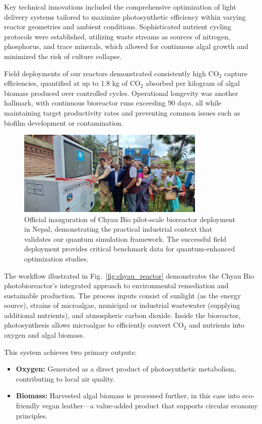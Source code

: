 \documentclass{article}
\begin{document}
Key technical innovations included the comprehensive optimization of light delivery systems tailored to maximize photosynthetic efficiency within varying reactor geometries and ambient conditions. Sophisticated nutrient cycling protocols were established, utilizing waste streams as sources of nitrogen, phosphorus, and trace minerals, which allowed for continuous algal growth and minimized the risk of culture collapse.

Field deployments of our reactors demonstrated consistently high CO$_2$ capture efficiencies, quantified at up to 1.8 kg of CO$_2$ absorbed per kilogram of algal biomass produced over controlled cycles. Operational longevity was another hallmark, with continuous bioreactor runs exceeding 90 days, all while maintaining target productivity rates and preventing common issues such as biofilm development or contamination.

\begin{figure}[h]
    \centering
    \includegraphics[width=0.8\textwidth]{inauguration-mayor.jpg}
    \caption{Official inauguration of Chyau Bio pilot-scale bioreactor deployment in Nepal, demonstrating the practical industrial context that validates our quantum simulation framework. The successful field deployment provides critical benchmark data for quantum-enhanced optimization studies.}
    \label{fig:chyau_deployment}
\end{figure}

The workflow illustrated in Fig.~\ref{fig:chyau_reactor} demonstrates the Chyau Bio photobioreactor's integrated approach to environmental remediation and sustainable production. The process inputs consist of sunlight (as the energy source), strains of microalgae, municipal or industrial wastewater (supplying additional nutrients), and atmospheric carbon dioxide. Inside the bioreactor, photosynthesis allows microalgae to efficiently convert CO$_2$ and nutrients into oxygen and algal biomass.

This system achieves two primary outputs: 
\begin{itemize}
    \item \textbf{Oxygen:} Generated as a direct product of photosynthetic metabolism, contributing to local air quality.
    \item \textbf{Biomass:} Harvested algal biomass is processed further, in this case into eco-friendly vegan leather—a value-added product that supports circular economy principles.
\end{itemize}
\end{document}
